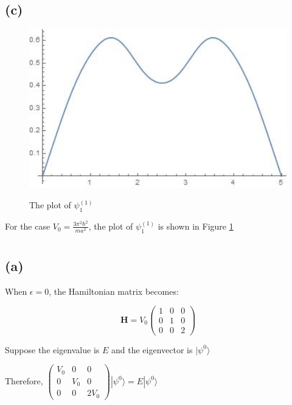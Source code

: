 \documentclass[12pt]{article}
\begin{document}
\begin{spacing}{2.0}
\subsection*{(c)}

\begin{figure}
  \centering
  \includegraphics[width=5in]{out1}\\
  \caption{The plot of $\psi_1^{(1)}$}\label{out1}
\end{figure}

For the case $V_0=\frac{3\pi^2 \hbar^2}{ma^2}$, the plot of $\psi_1^{(1)}$ is shown in Figure \ref{out1}

\section{} %

\subsection*{(a)}
When $\epsilon=0$, the Hamiltonian matrix becomes:

$$\mathbf{H}=V_0\left(
\begin{array}{ccc}
1 & 0 & 0 \\
0 & 1 & 0 \\
0 & 0 & 2
\end{array}
\right)$$

Suppose the eigenvalue is $E$ and the eigenvector is $|\psi^0\rangle$

Therefore, $\left(
\begin{array}{ccc}
V_0 & 0 & 0 \\
0 & V_0 & 0 \\
0 & 0 & 2V_0
\end{array}
\right) |\psi^0\rangle
=E|\psi^0\rangle$


\end{spacing}
\end{document}
